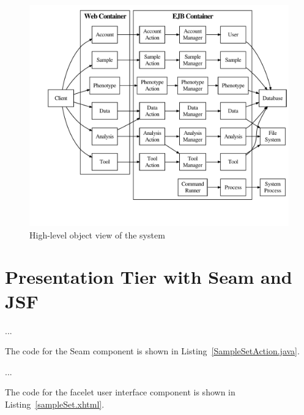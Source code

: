 \begin{landscape}
\begin{figure}[!htpb] 
  \centering
  \includegraphics[width=1.1\textwidth]{diagrams/Architecture2}
  \caption{High-level object view of the system}
  \label{fig:architecture2}
\end{figure}
\end{landscape}





\section{Presentation Tier with Seam and JSF}
\label{sec:ui}

...

The code for the Seam component is shown in
Listing~\ref{SampleSetAction.java}.

...

The code for the facelet user interface component is shown in
Listing~\ref{sampleSet.xhtml}.






